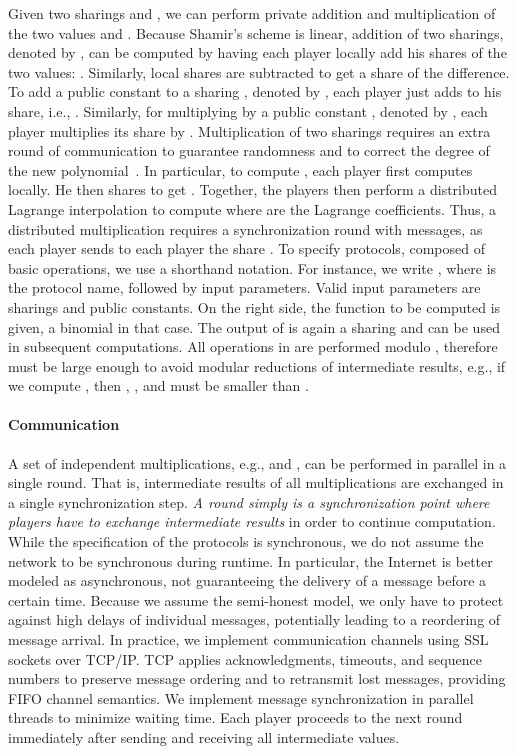 \documentclass[letterpaper,11pt,onecolumn,titlepage]{article}
\begin{document}
Given two sharings  and , we can perform private addition and multiplication of the two values  and . 
Because Shamir's scheme is linear, addition of two sharings, denoted by , can be computed by having 
each player locally add his shares of the two values: .
Similarly, local shares are subtracted to get a share of the difference.
To add a public constant  to a sharing , denoted by , each player just adds  to his share, i.e.,
. Similarly, for multiplying  by a public constant , denoted by , each player multiplies its share by .
Multiplication of two sharings requires an extra round of communication to guarantee randomness and to correct the degree of the
new polynomial~\cite{benor1988ctn,gennaro1998sva}. In particular, to compute , each player first computes  locally. He
then shares  to get . Together, the players then perform a distributed Lagrange interpolation to compute  where  are the Lagrange coefficients. Thus, a distributed multiplication requires a synchronization round with  messages, as each player  sends to each player  the share . 
To specify protocols, composed of basic operations, we use a shorthand notation. For instance, 
we write , where  is the protocol name, followed by input parameters. Valid input parameters are sharings and public
constants. On the right side, the function to be computed is given, a binomial in that case. The output of  is again a sharing and can be used in 
subsequent computations.
All operations in  are performed modulo ,
therefore  must be large enough to avoid modular reductions of
intermediate results, e.g., if we compute , then , , and  must be smaller than . 


\paragraph{Communication}
A set of independent multiplications, e.g.,  and , can be performed
in parallel in a single round. That is, intermediate results of all multiplications
are exchanged in a single synchronization step. \emph{A round simply is a
synchronization point where players have to exchange intermediate results} in order
to continue computation. 
While the specification of the protocols is synchronous, we do not assume the network
to be synchronous during runtime. In particular, the Internet is better modeled as asynchronous, not guaranteeing
the delivery of a message before a certain time. Because we assume the semi-honest model, we only have to
protect against high delays of individual messages, potentially leading to a reordering of message arrival.
In practice, we implement communication channels using SSL sockets over TCP/IP. TCP applies
acknowledgments, timeouts, and sequence numbers to preserve message ordering and to retransmit
lost messages, providing FIFO channel semantics. We implement message synchronization in parallel threads to minimize waiting time.
Each player proceeds to the next round immediately after sending and receiving all intermediate values.
\end{document}
